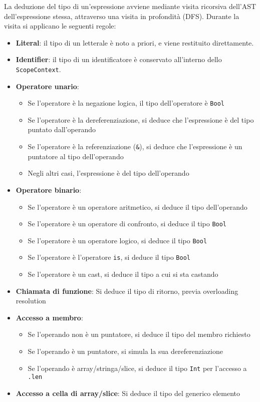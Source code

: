 \newpage

La deduzione del tipo di un'espressione avviene mediante visita ricorsiva dell'AST dell'espressione stessa,
attraverso una visita in profondità (DFS). Durante la visita si applicano le seguenti regole:

\vspace{1cm}
\begin{itemize}
    \item \textbf{Literal}: il tipo di un letterale è noto a priori, e viene restituito direttamente.
    \item \textbf{Identifier}: il tipo di un identificatore è conservato all'interno dello \texttt{ScopeContext}.
    \item \textbf{Operatore unario}: \begin{itemize}
        \item Se l'operatore è la negazione logica, il tipo dell'operatore è \texttt{Bool}
        \item Se l'operatore è la dereferenziazione, si deduce che l'espressione è del tipo puntato dall'operando
        \item Se l'operatore è la referenziazione (\texttt{\&}), si deduce che l'espressione è un puntatore al tipo dell'operando
        \item Negli altri casi, l'espressione è del tipo dell'operando
    \end{itemize}
    \item \textbf{Operatore binario}: \begin{itemize}
        \item Se l'operatore è un operatore aritmetico, si deduce il tipo dell'operando
        \item Se l'operatore è un operatore di confronto, si deduce il tipo \texttt{Bool}
        \item Se l'operatore è un operatore logico, si deduce il tipo \texttt{Bool}
        \item Se l'operatore è l'operatore \texttt{is}, si deduce il tipo \texttt{Bool}
        \item Se l'operatore è un cast, si deduce il tipo a cui si sta castando
    \end{itemize}
    \item \textbf{Chiamata di funzione}: Si deduce il tipo di ritorno, previa overloading resolution
    \item \textbf{Accesso a membro}: \begin{itemize}
        \item Se l'operando non è un puntatore, si deduce il tipo del membro richiesto
        \item Se l'operando è un puntatore, si simula la sua dereferenziazione
        \item Se l'operando è array/stringa/slice, si deduce il tipo \texttt{Int} per l'accesso a \texttt{.len}
    \end{itemize}
    \item \textbf{Accesso a cella di array/slice}: Si deduce il tipo del generico elemento
\end{itemize}

\newpage
